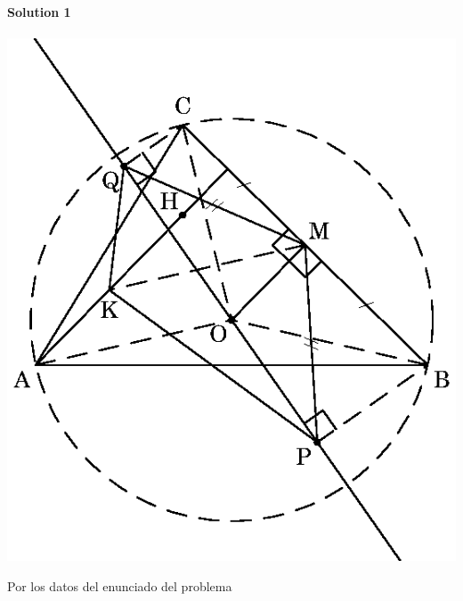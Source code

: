 \noindent\textbf{Solution 1 } \\\\

\includegraphics{share/euk/51M04_rmm202300004_1.eps}

Por los datos del enunciado del problema

